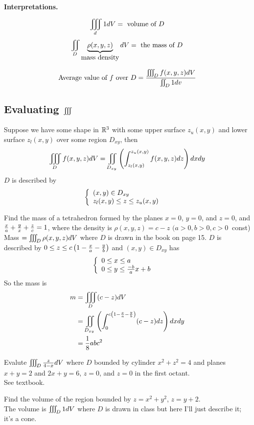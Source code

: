 \documentclass[english, 11pt]{article}
\begin{document}
\textbf{Interpretations.}

\[ \iiint\displaylimits_d 1 dV = \mbox{\ volume of $D$} \]
\[ \iint\displaylimits_D \underbrace{\rho(x,y,z)}_{\mbox{mass density}} dV = \mbox{\ the mass of $D$} \]

\[ \mbox{Average value of $f$ over $D$} = \frac{\iiint\displaylimits_D f(x,y,z) dV}{\iint\displaylimits_D 1dv} \]

\subsection{Evaluating $\iiint\displaylimits$}

Suppose we have some shape in ${\mathbb{R}}^3$ with some upper surface $z_u(x,y)$ and lower surface $z_l(x,y)$ over some region $D_{xy}$, then
\[ \iiint\displaylimits_D f(x,y,z) dV = \iint\displaylimits_{D_{xy}} \left( \int_{z_l(x,y)}^{z_u(x,y)} f(x,y,z) dz \right) dxdy \]
$D$ is described by
\[ \left\{ \begin{array}{lr} (x,y) \in D_{xy} & \mbox{} \\ z_l(x,y) \leq z \leq z_u(x,y) & \mbox{} \end{array} \right. \]

\begin{exmp}
  Find the mass of a tetrahedron formed by the planes $x = 0$, $y = 0$, and $z = 0$, and $\frac{x}{a} + \frac{y}{x} + \frac{z}{c} = 1$, where the density is $\rho(x,y,z) = c - z$ $(a > 0, b> 0, c>0\ $ const) \\

  Mass $= \iiint\displaylimits_D \rho(x,y,z) dV$ where $D$ is drawn in the book on page 15. $D$ is described by $0 \leq z \leq c \left( 1 - \frac{x}{a} - \frac{y}{b} \right)$ and $(x,y) \in D_{xy}$ has
  \[ \left\{ \begin{array}{lr} 0 \leq x \leq a & \mbox{} \\ 0 \leq y \leq \frac{-b}{a}x + b & \mbox{} \end{array} \right. \]
  So the mass is
  \begin{align*}
    m & = \iiint\displaylimits_D (c-z) dV \\
      & = \iint\displaylimits_{D_{xy}} \left( \int_0^{c \left( 1 - \frac{x}{a} - \frac{y}{b} \right)} (c-z) dz \right) dxdy \\
      & = \frac{1}{8} abc^2
  \end{align*}
\end{exmp}

\begin{exmp}
  Evalute $\iiint\displaylimits_D \frac{z}{4-x} dV$ where $D$ bounded by cylinder $x^2 + z^2 = 4$ and planes $x + y = 2$ and $2x + y= 6$, $z = 0$, and $z =0$ in the first octant. \\

  See textbook.
\end{exmp}

\begin{exmp}
  Find the volume of the region bounded by $z = x^2 + y^2$, $z = y + 2$. \\

  The volume is $\iiint\displaylimits_D 1 dV$ where $D$ is drawn in class but here I'll just describe it; it's a cone.
\end{exmp}
\end{document}
